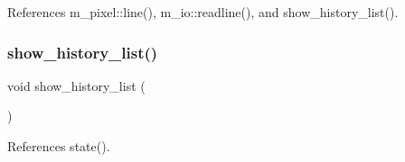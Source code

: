 References m\+\_\+pixel\+::line(), m\+\_\+io\+::readline(), and show\+\_\+history\+\_\+list().

\mbox{\label{C-M__readline_8c_a80269900528c2ee04bf7cacb3a07ff40}} 
\subsubsection{\texorpdfstring{show\+\_\+history\+\_\+list()}{show\_history\_list()}}
{\footnotesize\ttfamily void show\+\_\+history\+\_\+list (\begin{DoxyParamCaption}{ }\end{DoxyParamCaption})}



References state().

